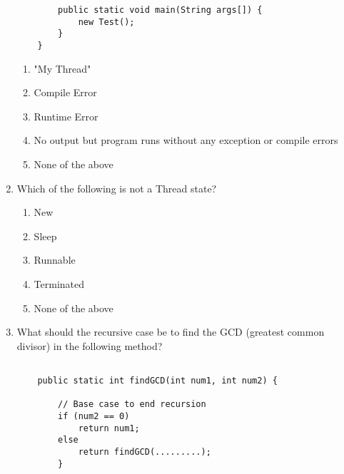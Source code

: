 \documentclass[S17-Final.tex]{subfiles}
\begin{document}
\begin{enumerate}
\begin{lstlisting}
        public static void main(String args[]) {
            new Test();
        }
    }
\end{lstlisting}
	
\begin{enumerate}
\item  "My Thread"
\item  Compile Error
\item  Runtime Error
\item  No output but program runs without any exception or compile errors
\item  None of the above
\end{enumerate}
\clearpage
\item Which of the following is not a Thread state?
	
\begin{enumerate}
\item  New
\item  Sleep
\item  Runnable
\item  Terminated
\item  None of the above
\end{enumerate}

%    
	

\item What should the recursive case be to find the GCD (greatest common divisor) in the following method?
\begin{lstlisting}

    public static int findGCD(int num1, int num2) {
    
        // Base case to end recursion
        if (num2 == 0)
            return num1;
        else
            return findGCD(.........);
        }
\end{lstlisting}
	

\end{enumerate}
\end{document}
